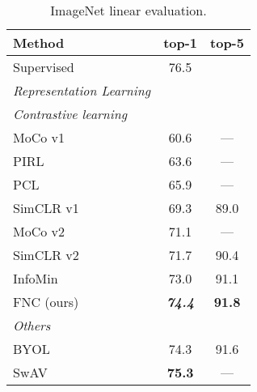 \documentclass[10pt,twocolumn,letterpaper]{article}
\begin{document}
\begin{table}[!b]
    \footnotesize
    \centering
    \begin{tabularx}{\linewidth}{Xcc}
    \toprule
    Method & top-1 & top-5\\
    \midrule
    Supervised & 76.5 &\\
    \hline
\small{\textit{Representation Learning}} &&\\
    \hdashline
    \small{\textit{Contrastive learning}} &&\\
    MoCo v1~\cite{he2019moco} & 60.6 & --- \\ 
    PIRL~\cite{misra2019selfsupervised} & 63.6 & ---\\  
    PCL~\cite{li2020prototypical} & 65.9 & --- \\
    SimCLR v1~\cite{chen2020simple}& 69.3 & 89.0\\
    MoCo v2~\cite{chen2020mocov2}& 71.1 & ---\\
    SimCLR v2~\cite{chen2020big} & 71.7 & 90.4\\
    InfoMin~\cite{tian2020what} & 73.0 & 91.1\\
    FNC (ours) & \textit{\textbf{74.4}} & \textbf{91.8}\\
    \hdashline
    \small{\textit{Others}} &&\\
    BYOL~\cite{grill2020bootstrap} & 74.3& 91.6\\
    SwAV~\cite{caron2020unsupervised}& \textbf{75.3} & ---\\
\hline
    \end{tabularx}
    \vspace{5pt}
    \caption{ImageNet linear evaluation.} \label{tab:imagenet_linear_eval}
\end{table}
\end{document}

